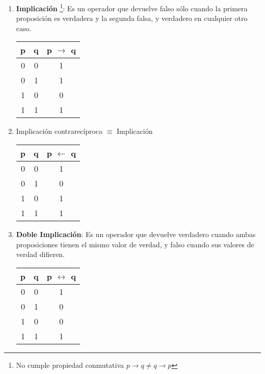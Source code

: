 \documentclass[a4paper, twoside]{article}
\begin{document}
\begin{enumerate}
	\item \textbf{Implicación} \footnote{No cumple propiedad conmutativa $p \to q \neq q \to p$}: Es un operador que devuelve falso sólo cuando la primera proposición es verdadera y la segunda falsa, y verdadero en cualquier otro caso.
		\begin{center}
			\begin{tabular}{|c|c|c|}
			\hline
			\textbf{p} & \textbf{q} & \textbf{p} $\to$ \textbf{q}\\
			\cline{0 - 1}
			\hline
			0 & 0  & 1\\
			0 & 1  & 1\\
			1 & 0  & 0\\
			1 & 1  & 1\\
			\hline
			\end{tabular}
		\end{center}
	
	\item Implicación contrarecíproca $\equiv$ Implicación
		\begin{center}
			\begin{tabular}{|c|c|c|}
			\hline
			\textbf{p} & \textbf{q} & \textbf{p} $\leftarrow$ \textbf{q}\\
			\cline{0 - 1}
			\hline
			0 & 0  & 1\\
			0 & 1  & 0\\
			1 & 0  & 1\\
			1 & 1  & 1\\
			\hline
			\end{tabular}
		\end{center}
	
	\item \textbf{Doble Implicación}: Es un operador que devuelve verdadero cuando ambas proposiciones tienen el mismo valor de verdad, y falso cuando sus valores de verdad difieren.
		\begin{center}
			\begin{tabular}{|c|c|c|}
			\hline
			\textbf{p} & \textbf{q} & \textbf{p} $\leftrightarrow$ \textbf{q}\\
			\cline{0 - 1}
			\hline
			0 & 0  & 1\\
			0 & 1  & 0\\
			1 & 0  & 0\\
			1 & 1  & 1\\
			\hline
			\end{tabular}
		\end{center}
\end{enumerate}
\end{document}
